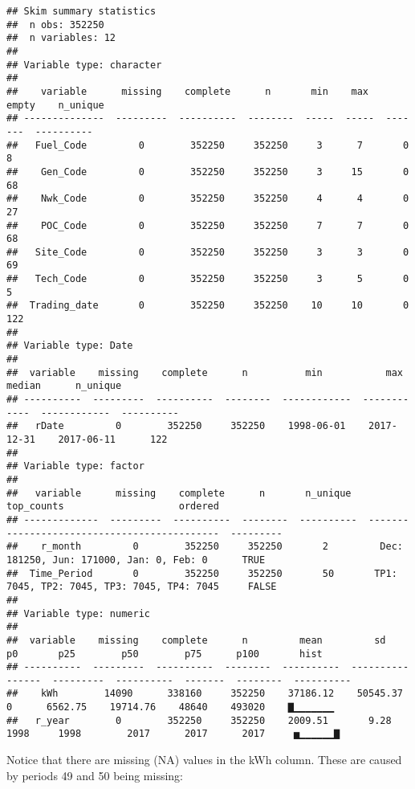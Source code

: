 \documentclass[]{article}
\begin{document}
\begin{verbatim}
## Skim summary statistics  
##  n obs: 352250    
##  n variables: 12    
## 
## Variable type: character
## 
##    variable      missing    complete      n       min    max    empty    n_unique 
## --------------  ---------  ----------  --------  -----  -----  -------  ----------
##   Fuel_Code         0        352250     352250     3      7       0         8     
##    Gen_Code         0        352250     352250     3     15       0         68    
##    Nwk_Code         0        352250     352250     4      4       0         27    
##    POC_Code         0        352250     352250     7      7       0         68    
##   Site_Code         0        352250     352250     3      3       0         69    
##   Tech_Code         0        352250     352250     3      5       0         5     
##  Trading_date       0        352250     352250    10     10       0        122    
## 
## Variable type: Date
## 
##  variable    missing    complete      n          min           max          median      n_unique 
## ----------  ---------  ----------  --------  ------------  ------------  ------------  ----------
##   rDate         0        352250     352250    1998-06-01    2017-12-31    2017-06-11      122    
## 
## Variable type: factor
## 
##   variable      missing    complete      n       n_unique                    top_counts                    ordered 
## -------------  ---------  ----------  --------  ----------  --------------------------------------------  ---------
##    r_month         0        352250     352250       2         Dec: 181250, Jun: 171000, Jan: 0, Feb: 0      TRUE   
##  Time_Period       0        352250     352250       50       TP1: 7045, TP2: 7045, TP3: 7045, TP4: 7045     FALSE  
## 
## Variable type: numeric
## 
##  variable    missing    complete      n         mean         sd        p0       p25        p50        p75      p100       hist   
## ----------  ---------  ----------  --------  ----------  ----------  ------  ---------  ----------  -------  --------  ----------
##    kWh        14090      338160     352250    37186.12    50545.37     0      6562.75    19714.76    48640    493020    ▇▁▁▁▁▁▁▁ 
##   r_year        0        352250     352250    2009.51       9.28      1998     1998        2017      2017      2017     ▅▁▁▁▁▁▁▇
\end{verbatim}

Notice that there are missing (NA) values in the kWh column. These are
caused by periods 49 and 50 being missing:
\end{document}
